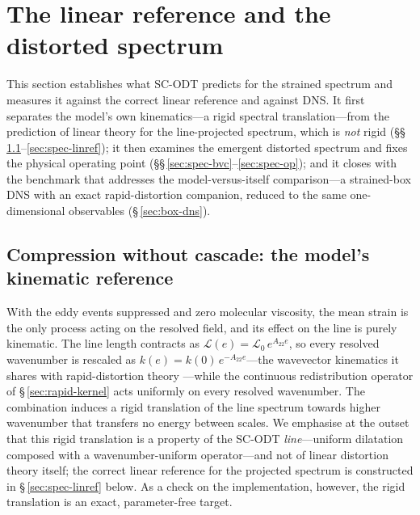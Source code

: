 \documentclass[lineno]{JFM-FLM_Au}
\begin{document}
\section{The linear reference and the distorted spectrum}\label{sec:val-spectrum}

This section establishes what SC-ODT predicts for the strained spectrum
and measures it against the correct linear reference and against DNS.
It first separates the model's own kinematics---a rigid spectral
translation---from the prediction of linear theory for the
line-projected spectrum, which is \emph{not} rigid
(\S\S\,\ref{sec:spec-rdt}--\ref{sec:spec-linref}); it then examines the
emergent distorted spectrum and fixes the physical operating point
(\S\S\,\ref{sec:spec-bvc}--\ref{sec:spec-op}); and it closes with the
benchmark that addresses the model-versus-itself comparison---a
strained-box DNS with an exact rapid-distortion companion, reduced to
the same one-dimensional observables (\S\,\ref{sec:box-dns}).

\subsection{Compression without cascade: the model's kinematic
reference}\label{sec:spec-rdt}

With the eddy events suppressed and zero molecular viscosity, the mean strain
is the only process acting on the resolved field, and its effect on the line
is purely kinematic. The line length contracts as
$\mathcal{L}(e)=\mathcal{L}_0\,e^{A_{22}e}$, so every resolved wavenumber is
rescaled as $k(e)=k(0)\,e^{-A_{22}e}$---the wavevector kinematics it shares
with rapid-distortion theory \citep{BatchelorProudman1954,HuntCarruthers1990}%
---while the continuous redistribution operator of
\S\,\ref{sec:rapid-kernel} acts uniformly on every resolved wavenumber. The combination induces a rigid translation of the line spectrum towards higher wavenumber that transfers no energy between scales. We emphasise at the outset that this
rigid translation is a property of the SC-ODT \emph{line}---uniform
dilatation composed with a wavenumber-uniform operator---and not of linear
distortion theory itself; the correct linear reference for the projected
spectrum is constructed in \S\,\ref{sec:spec-linref} below. As a check on the
implementation, however, the rigid translation is an exact, parameter-free
target.
\end{document}
